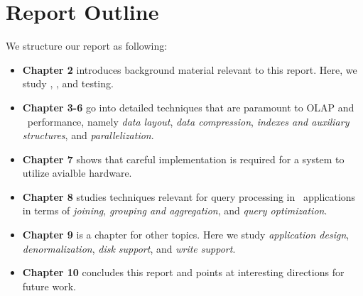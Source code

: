 \section{Report Outline}
\label{sec:Thesis Outline}
We structure our report as following:
\begin{itemize}
  \item \textbf{Chapter 2} introduces background material relevant to this report. Here, we study \bi, \bd, and testing.
  \item \textbf{Chapter 3-6} go into detailed techniques that are paramount to OLAP and \bd~performance, namely \textit{data layout}, \textit{data compression}, \textit{indexes and auxiliary structures}, and \textit{parallelization}.
  \item \textbf{Chapter 7} shows that careful implementation is required for a system to utilize avialble hardware. 
  \item \textbf{Chapter 8} studies techniques relevant for query processing in \bd~applications in terms of \textit{joining}, \textit{grouping and aggregation}, and \textit{query optimization}.
  \item \textbf{Chapter 9} is a chapter for other topics. Here we study \textit{application design}, \textit{denormalization}, \textit{disk support}, and \textit{write support}.
  \item \textbf{Chapter 10} concludes this report and points at interesting directions for future work.
\end{itemize}
